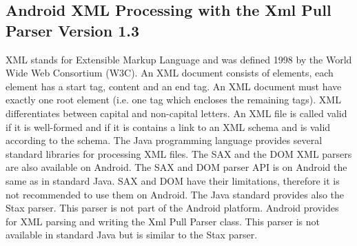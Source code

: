\subsection{Android XML Processing with the Xml Pull Parser Version 1.3}
XML stands for Extensible Markup Language and was defined 1998 by the World Wide Web Consortium (W3C).  An XML document consists of elements, each element has a start tag, content and an end tag. An XML document must have exactly one root element (i.e. one tag which encloses the remaining tags). XML differentiates between capital and non-capital letters. An XML file is called valid if it is well-formed and if it is contains a link to an XML schema and is valid according to the schema. The Java programming language provides several standard libraries for processing XML files. The SAX and the DOM XML parsers are also available on Android. The SAX and DOM parser API is on Android the same as in standard Java. SAX and DOM have their limitations, therefore it is not recommended to use them on Android. The Java standard provides also the Stax parser. This parser is not part of the Android platform. Android provides for XML parsing and writing the Xml Pull Parser class. This parser is not available in standard Java but is similar to the Stax parser.\cite{xmlpullparser}





